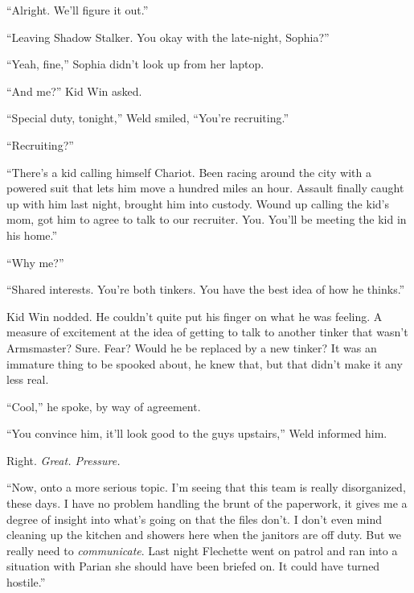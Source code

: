 ``Alright.  We'll figure it out.''



``Leaving Shadow Stalker.  You okay with the late-night, Sophia?''



``Yeah, fine,'' Sophia didn't look up from her laptop.



``And me?'' Kid Win asked.



``Special duty, tonight,'' Weld smiled, ``You're recruiting.''



``Recruiting?''



``There's a kid calling himself Chariot.  Been racing around the city with a powered suit that lets him move a hundred miles an hour.  Assault finally caught up with him last night, brought him into custody.  Wound up calling the kid's mom, got him to agree to talk to our recruiter.  You.  You'll be meeting the kid in his home.''



``Why me?''



``Shared interests.  You're both tinkers.  You have the best idea of how he thinks.''



Kid Win nodded.  He couldn't quite put his finger on what he was feeling.  A measure of excitement at the idea of getting to talk to another tinker that wasn't Armsmaster?  Sure.  Fear?  Would he be replaced by a new tinker?  It was an immature thing to be spooked about, he knew that, but that didn't make it any less real.



``Cool,'' he spoke, by way of agreement.



``You convince him, it'll look good to the guys upstairs,'' Weld informed him.



Right.  \emph{Great. Pressure.}



``Now, onto a more serious topic.  I'm seeing that this team is really disorganized, these days.  I have no problem handling the brunt of the paperwork, it gives me a degree of insight into what's going on that the files don't.  I don't even mind cleaning up the kitchen and showers here when the janitors are off duty.  But we really need to \emph{communicate}.  Last night Flechette went on patrol and ran into a situation with Parian she should have been briefed on.  It could have turned hostile.''



